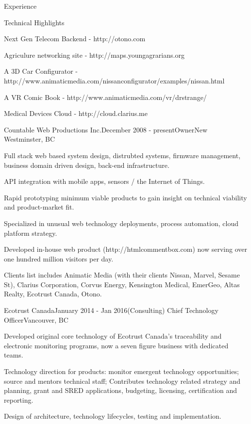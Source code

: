 \documentclass{resume} %
\begin{document}

\begin{rSection}{Experience}

\begin{rSubsection}{Technical Highlights}{}{}{}
\item Next Gen Telecom Backend - http://otono.com
\item Agriculure networking site - http://maps.youngagrarians.org
\item A 3D Car Configurator - http://www.animaticmedia.com/nissanconfigurator/examples/nissan.html
\item A VR Comic Book - http://www.animaticmedia.com/vr/drstrange/
\item Medical Devices Cloud - http://cloud.clarius.me
\end{rSubsection}


\begin{rSubsection}{Countable Web Productions Inc.}{December 2008 - present}{Owner}{New Westminster, BC}
\item Full stack web based system design, distrubted systems, firmware management, business domain driven design, back-end infrastructure.
\item API integration with mobile apps, sensors / the Internet of Things.
\item Rapid prototyping minimum viable products to gain insight on technical viability and product-market fit.
\item Specialized in unusual web technology deployments, process automation, cloud platform strategy.
\item Developed in-house web product (http://htmlcommentbox.com) now serving over one hundred million visitors per day.
\item Clients list includes Animatic Media (with their clients Nissan, Marvel, Sesame St), Clarius Corporation, Corvus Energy, Kensington Medical, EmerGeo, Altas Realty, Ecotrust Canada, Otono.
\end{rSubsection}


\begin{rSubsection}{Ecotrust Canada}{January 2014 - Jan 2016}{(Consulting) Chief Technology Officer}{Vancouver, BC}
\item Developed original core technology of Ecotrust Canada's traceability and electronic monitoring programs, now a seven figure business with dedicated teams.
\item Technology direction for products: monitor emergent technology opportunities; source and mentors technical staff; Contributes technology related strategy and planning, grant and SRED applications, budgeting, licensing, certification and reporting.
\item Design of architecture, technology lifecycles, testing and implementation.
\end{rSubsection}


\end{rSection}
\end{document}
